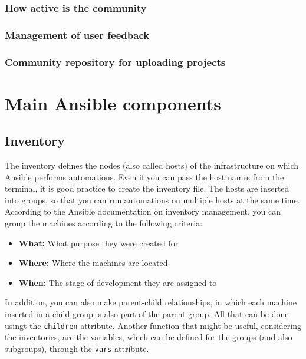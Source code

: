 \documentclass[12pt,a4paper,openright,twoside]{book}
\begin{document}
            \subsubsection{How active is the community}
            \subsubsection{Management of user feedback}
            \subsubsection{Community repository for uploading projects}

\section{Main Ansible components}

\subsection{Inventory}
            The inventory defines the nodes (also called hosts) of the infrastructure on which Ansible performs automations.
            Even if you can pass the host names from the terminal, it is good practice to create the inventory file.
            The hosts are inserted into groups, so that you can run automations on multiple hosts at the same time.
            According to the Ansible documentation on inventory management\cite{ansibleDocInventory}, you can group the machines according to the following criteria:
            
            \begin{itemize}
                \item \textbf{What:} What purpose they were created for
                \item \textbf{Where:} Where the machines are located
                \item \textbf{When:} The stage of development they are assigned to
            \end{itemize}
            
            In addition, you can also make parent-child relationships, in which each machine inserted in a child group is also part of the parent group. All that can be done usingt the \texttt{children} attribute.
            Another function that might be useful, considering the inventories, are the variables, which can be defined for the groups (and also subgroups), through the \texttt{vars} attribute.
\end{document}
